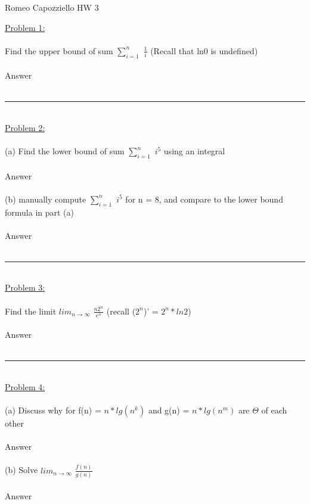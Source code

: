 \documentclass{article}
\begin{document}
    \begin{center}
        Romeo Capozziello HW 3
    \end{center}
    \underline{Problem 1:}\\\\
    Find the upper bound of sum $\sum_{i=1}^{n}$ $\frac{1}{i}$ (Recall that ln0 is undefined)\\
    \\
    \indent Answer\\
    \\
    \rule{\textwidth}{0.5pt}\\
    \underline{Problem 2:}\\\\
    (a) Find the lower bound of sum $\sum_{i=1}^n$ $i^5$ using an integral\\
    \\
    \indent Answer\\
    \\
    (b) manually compute $\sum_{i=1}^n$ $i^5$ for n = 8, and compare to the lower bound formula in part (a)\\
    \\
    \indent Answer\\
    \\
    \rule{\textwidth}{0.5pt}\\
    \underline{Problem 3:}\\\\
    Find the limit $lim_{n\rightarrow\infty}$ $\frac{n2^n}{e^n}$ (recall ($2^n$)' = $2^n*ln2$)\\
    \\
    \indent Answer\\
    \\
    \rule{\textwidth}{0.5pt}\\
    \underline{Problem 4:}\\\\
    (a) Discuss why for f(n) = $n*lg(n^k)$ and g(n) = $n*lg(n^m)$ are $\Theta$ of each other\\
    \\
    \indent Answer\\
    \\
    (b) Solve $lim_{n\rightarrow\infty}$ $\frac{f(n)}{g(n)}$\\
    \\
    \indent Answer\\
    \\
\end{document}
